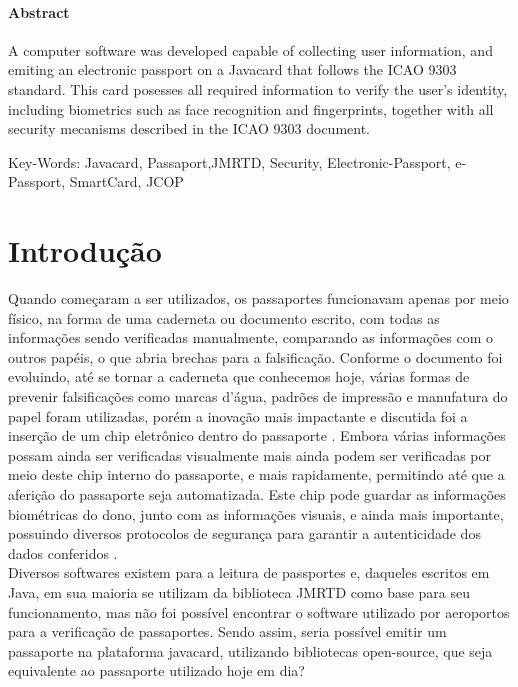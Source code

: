 \documentclass{article}
\begin{document}
	\paragraph{\large Abstract}
		\begin{justify}

			\hspace{2cm} A computer software was developed capable of collecting user information, and emiting an electronic passport on a Javacard that follows the ICAO 9303 standard. This card posesses all required information to verify the user's identity, including biometrics such as face recognition and fingerprints, together with all security mecanisms described in the ICAO 9303 document.

	\vspace*{10px}
Key-Words: Javacard, Passaport,JMRTD, Security, Electronic-Passport, e-Passport, SmartCard, JCOP

		\end{justify}
	
	\newpage

	\tableofcontents
	\listoffigures
	\newpage

	\pagenumbering{arabic}

	\section{Introdução}
		\begin{justify}
			
			\hspace{2cm} Quando começaram a ser utilizados, os passaportes funcionavam apenas por meio físico, na forma de uma caderneta ou documento escrito, com todas as informações sendo verificadas manualmente, comparando as informações com o outros papéis, o que abria brechas para a falsificação. Conforme o documento foi evoluindo, até se tornar a caderneta que conhecemos hoje, várias formas de prevenir falsificações como marcas d’água, padrões de impressão e manufatura do papel foram utilizadas, porém a inovação mais impactante e discutida foi a inserção de um chip eletrônico dentro do passaporte \parencite{WIKIPEDIA}. Embora várias informações possam ainda ser verificadas visualmente mais ainda podem ser verificadas por meio deste chip interno do passaporte, e mais rapidamente, permitindo até que a aferição do passaporte seja automatizada. Este chip pode guardar as informações biométricas do dono, junto com as informações visuais, e ainda mais importante, possuindo diversos protocolos de segurança para garantir a autenticidade dos dados conferidos \parencite{HOWPASSPORT}.\\
			\hspace*{2cm} Diversos softwares existem para a leitura de passportes e, daqueles escritos em Java, em sua maioria se utilizam da biblioteca JMRTD\parencite{JMRTD} como base para seu funcionamento, mas não foi possível encontrar o software utilizado por aeroportos para a verificação de passaportes. Sendo assim, seria possível emitir um passaporte na plataforma javacard, utilizando bibliotecas open-source, que seja equivalente ao passaporte utilizado hoje em dia?

			
		\end{justify}
\end{document}
